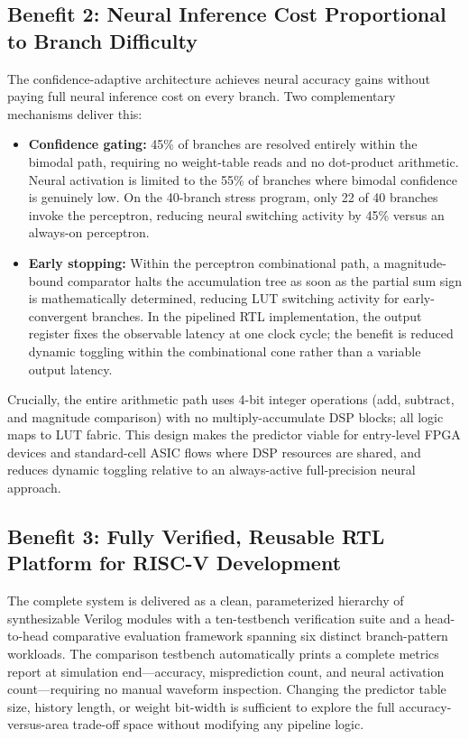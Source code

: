 \documentclass[12pt,a4paper]{article}
\begin{document}
\subsection*{Benefit 2: Neural Inference Cost Proportional to Branch Difficulty}

The confidence-adaptive architecture achieves neural accuracy gains without paying
full neural inference cost on every branch. Two complementary mechanisms deliver
this:

\begin{itemize}
  \item \textbf{Confidence gating:} 45\% of branches are resolved entirely within
    the bimodal path, requiring no weight-table reads and no dot-product arithmetic.
    Neural activation is limited to the 55\% of branches where bimodal confidence
    is genuinely low. On the 40-branch stress program, only 22 of 40 branches
    invoke the perceptron, reducing neural switching activity by 45\% versus
    an always-on perceptron.

  \item \textbf{Early stopping:} Within the perceptron combinational path, a
    magnitude-bound comparator halts the accumulation tree as soon as the partial
    sum sign is mathematically determined, reducing LUT switching activity for
    early-convergent branches. In the pipelined RTL implementation, the output
    register fixes the observable latency at one clock cycle; the benefit is
    reduced dynamic toggling within the combinational cone rather than a
    variable output latency.
\end{itemize}

Crucially, the entire arithmetic path uses 4-bit integer operations (add,
subtract, and magnitude comparison) with no multiply-accumulate DSP blocks;
all logic maps to LUT fabric. This design makes the predictor viable for entry-level FPGA devices and
standard-cell ASIC flows where DSP resources are shared, and reduces dynamic
toggling relative to an always-active full-precision neural approach.

\subsection*{Benefit 3: Fully Verified, Reusable RTL Platform for RISC-V Development}

The complete system is delivered as a clean, parameterized hierarchy of synthesizable
Verilog modules with a ten-testbench verification suite and a head-to-head
comparative evaluation framework spanning six distinct branch-pattern workloads. The comparison testbench automatically prints a
complete metrics report at simulation end---accuracy, misprediction count, and
neural activation count---requiring no manual waveform inspection. Changing the predictor table size, history length, or weight bit-width
is sufficient to explore the full accuracy-versus-area trade-off space without
modifying any pipeline logic.
\end{document}
